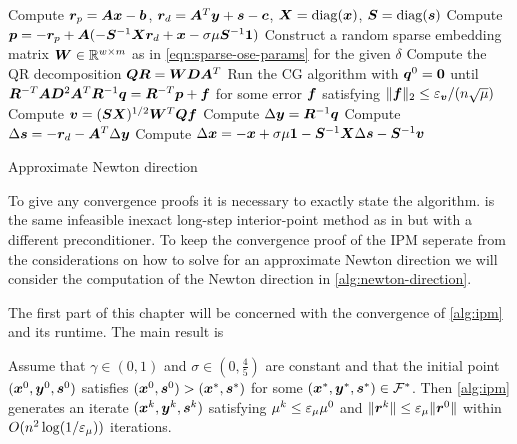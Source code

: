 \begin{algorithm}[p]
  Compute \(\bm{r}_p = \bm{A}\bm{x} - \bm{b}\), \(\bm{r}_d = \bm{A}^T \bm{y} + \bm{s} - \bm{c}\), \(\bm{X} = \operatorname{diag}(\bm{x})\), \(\bm{S} = \operatorname{diag}(\bm{s})\)\;
  Compute \(\bm{p} = -\bm{r}_p + \bm{A}(-\bm{S}^{-1}\bm{X}\bm{r}_d + \bm{x} - \sigma \mu \bm{S}^{-1} \bm{1})\)\;
  Construct a random sparse embedding matrix \(\bm{W} \in \mathbb{R}^{w \times m}\) as in \cref{eqn:sparse-ose-params} for the given \(\delta\)\;
  Compute the QR decomposition \(\bm{Q} \bm{R} = \bm{W} \bm{D} \bm{A}^T\)\;
  Run the CG algorithm with \(\bm{q}^0 = \bm{0}\) until \(\bm{R}^{-T} \bm{A} \bm{D}^2 \bm{A}^T \bm{R}^{-1} \bm{q} = \bm{R}^{-T} \bm{p} + \bm{f}\) for some error \(\bm{f}\) satisfying \(\lVert \bm{f} \rVert_2 \leq \varepsilon_{\bm{v}}/(n \sqrt{\mu})\)\; \label{line:cg}
  Compute \(\bm{v} = (\bm{S} \bm{X})^{1/2} \bm{W}^T \bm{Q} \bm{f}\)\; \label{line:compute-v}
  Compute \(\Delta\bm{y} = \bm{R}^{-1}\bm{q}\)\;
  Compute \(\Delta\bm{s} = -\bm{r}_d - \bm{A}^T \Delta\bm{y}\)\;
  Compute \(\Delta\bm{x} = -\bm{x} + \sigma \mu \bm{1} - \bm{S}^{-1}\bm{X} \Delta\bm{s} - \bm{S}^{-1} \bm{v}\)\; \label{line:compute-delta-x}
  \;
  \caption{Approximate Newton direction} \label{alg:newton-direction}
\end{algorithm}

To give any convergence proofs it is necessary to exactly state the algorithm.
 is the same infeasible inexact long-step interior-point method as in \cite{Avron-FasterRandomizedInfeasibleIPMs,Monteiro-ConvergenceAnalysisLongStepInfeasibleIPMs} but with a different preconditioner.
To keep the convergence proof of the IPM seperate from the considerations on how to solve for an approximate Newton direction we will consider the computation of the Newton direction in \cref{alg:newton-direction}.

The first part of this chapter will be concerned with the convergence of \cref{alg:ipm} and its runtime.
The main result is
\begin{theorem}
Assume that \(\gamma \in (0, 1)\) and \(\sigma \in (0, \frac{4}{5})\) are constant and that the initial point \((\bm{x}^0, \bm{y}^0, \bm{s}^0)\) satisfies \((\bm{x}^0, \bm{s}^0) > (\bm{x}^*, \bm{s}^*)\) for some \((\bm{x}^*, \bm{y}^*, \bm{s}^*) \in \mathcal{F}^*\).
Then \cref{alg:ipm} generates an iterate \((\bm{x}^k, \bm{y}^k, \bm{s}^k)\) satisfying \(\mu^k \leq \varepsilon_\mu \mu^0\) and \(\lVert \bm{r}^k \rVert \leq \varepsilon_\mu \lVert \bm{r}^0 \rVert\) within \(O(n^2 \log(1/\varepsilon_\mu))\) iterations.
\end{theorem}

